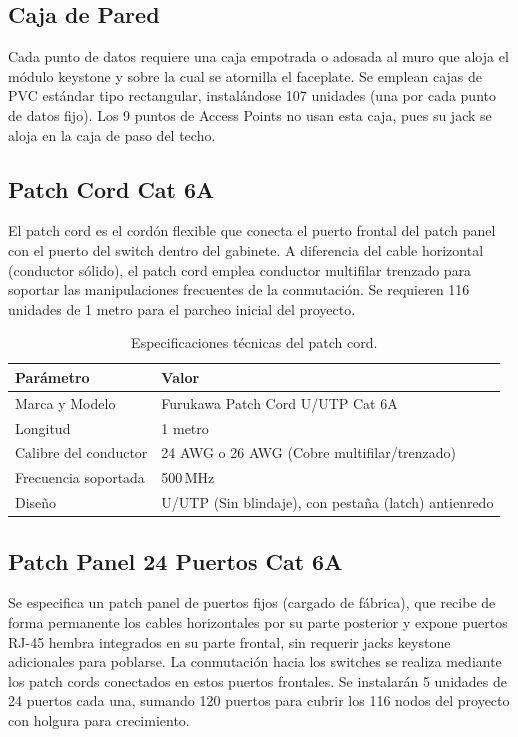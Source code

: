 \subsection{Caja de Pared}
Cada punto de datos requiere una caja empotrada o adosada al muro que aloja el módulo keystone y sobre la cual se atornilla el faceplate. Se emplean cajas de PVC estándar tipo rectangular, instalándose 107 unidades (una por cada punto de datos fijo). Los 9 puntos de Access Points no usan esta caja, pues su jack se aloja en la caja de paso del techo.

\subsection{Patch Cord Cat 6A}
El patch cord es el cordón flexible que conecta el puerto frontal del patch panel con el puerto del switch dentro del gabinete. A diferencia del cable horizontal (conductor sólido), el patch cord emplea conductor multifilar trenzado para soportar las manipulaciones frecuentes de la conmutación. Se requieren 116 unidades de 1 metro para el parcheo inicial del proyecto.

\begin{table}[H]
\centering
\caption{Especificaciones técnicas del patch cord.}
\label{tab:spec_patchcord}
\begin{tabular}{lp{9cm}}
\hline
\textbf{Parámetro} & \textbf{Valor} \\
\hline
Marca y Modelo & Furukawa Patch Cord U/UTP Cat 6A \\
Longitud & 1 metro \\
Calibre del conductor & 24 AWG o 26 AWG (Cobre multifilar/trenzado) \\
Frecuencia soportada & 500\,MHz \\
Diseño & U/UTP (Sin blindaje), con pestaña (latch) antienredo \\
\hline
\end{tabular}
\end{table}

\subsection{Patch Panel 24 Puertos Cat 6A}
Se especifica un patch panel de puertos fijos (cargado de fábrica), que recibe de forma permanente los cables horizontales por su parte posterior y expone puertos RJ-45 hembra integrados en su parte frontal, sin requerir jacks keystone adicionales para poblarse. La conmutación hacia los switches se realiza mediante los patch cords conectados en estos puertos frontales. Se instalarán 5 unidades de 24 puertos cada una, sumando 120 puertos para cubrir los 116 nodos del proyecto con holgura para crecimiento.

